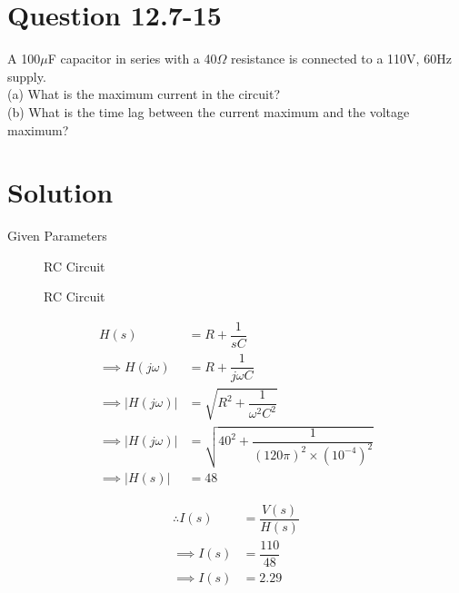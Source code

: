 \documentclass[journal,12pt,twocolumn]{IEEEtran}
\theoremstyle{remark}
\begin{document}
\section{Question 12.7-15}
A 100$\mu$F capacitor in series with a 40$\Omega$ resistance is
connected to a 110V, 60Hz supply.\\
(a) What is the maximum current in the circuit?\\
(b) What is the time lag between the current maximum and the voltage maximum?\\
\section{Solution}
\begin{table}[!h]
	\centering
	
	\vspace{6 pt}
	\caption{Given Parameters}
	\label{tab:enter-label}
\end{table}
\begin{figure}[!h]
	\centering
	
	\caption{RC Circuit}
	\label{fig:1}
\end{figure}
\vspace{2cm}
\begin{figure}[!h]
	\centering
	
	\caption{RC Circuit}
	\label{fig:2}
\end{figure}
\begin{align}
\label{eq:tri-pts/19}
  H(s)&=R+\dfrac{1}{sC}\\
\label{eq:tri-pts/20}\implies H(j \omega)
&=R+\dfrac{1}{j \omega C}\\
\label{eq:tri-pts/21}\implies |H(j \omega)| &= \sqrt{R^2 + \dfrac{1}{\omega^2 C^2}}\\
\label{eq:tri-pts/22}\implies |H(j \omega)|&=\sqrt{40^2 + \dfrac{1}{{(120\pi)^2 \times (10^{-4})^2}}}\\
\label{eq:tri-pts/23}\implies |H(s)|&=48
\end{align}

\begin{align}
\label{eq:tri-pts/24} \therefore I(s)&=\dfrac{V(s)}{H(s)}\\
\label{eq:tri-pts/25}
\implies I(s)&=\dfrac{110}{48}\\
\label{eq:tri-pts/26}
\implies I(s)&=2.29
\end{align}
\end{document}
